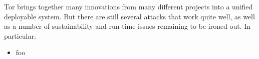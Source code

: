 \documentclass[times,10pt,twocolumn]{article}
\begin{document}
\label{sec:conclusion}

Tor brings together many innovations from many different projects into
a unified deployable system. But there are still several attacks that
work quite well, as well as a number of sustainability and run-time
issues remaining to be ironed out. In particular:

\begin{itemize}
\item foo
\end{itemize}






\end{document}
